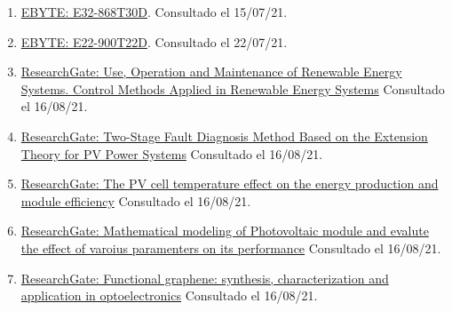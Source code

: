 \documentclass[12pt]{article}
\begin{document}
			\begin{enumerate}
				\item 
				\label{bib: imagen E32}
				\href{https://www.ebyte.com/en/product-view-news.aspx?id=189}{EBYTE: E32-868T30D}. Consultado el 15/07/21.
				
				\item 
				\label{bib: imagen E22}
				\href{https://www.ebyte.com/en/product-view-news.html?id=1117}{EBYTE: E22-900T22D}. Consultado el 22/07/21.
				
				\item
				\label{bib: research gate mppt curve} \href{https://www.researchgate.net/figure/Characteristic-curves-of-MPPT-a-power-voltage-curve-and-b-current-voltage-curve_fig7_278728718}{ResearchGate: Use, Operation and Maintenance of Renewable Energy Systems. Control Methods Applied in Renewable Energy Systems} Consultado el 16/08/21.
				
				\item 
				\label{bib: research gate pv power}
				\href{https://www.researchgate.net/figure/The-I-V-characteristic-curve-of-solar-cells-under-different-temperature_fig1_258388008}{ResearchGate: Two-Stage Fault Diagnosis Method Based on the Extension Theory for PV Power Systems} Consultado el 16/08/21.
				
				\item 
				\label{bib: research gate pv cell temp vs others}
				\href{https://www.researchgate.net/figure/The-PV-module-temperature-and-electrical-power-distribution-together-with-model-inputs_fig1_316548825}{ResearchGate: The PV cell temperature effect on the energy production and module efficiency} Consultado el 16/08/21.
				
				\item 
				\label{bib: research gate pv cell param}
				\href{https://www.researchgate.net/figure/I-V-characteristics-curve-of-a-PV-cell_fig2_313450163}{ResearchGate: Mathematical modeling of Photovoltaic module and evalute the effect of varoius paramenters on its performance}	Consultado el 16/08/21.				
			
				\item 
				\label{bib: research gate JV curve solar panel}
				\href{https://www.researchgate.net/figure/J-V-characteristic-of-a-typical-solar-cell-in-the-dark-dashed-line-and-under_fig37_283662836}{ResearchGate: Functional graphene: synthesis, characterization and application in optoelectronics} Consultado el 16/08/21.
				

\end{enumerate}
\end{document}
